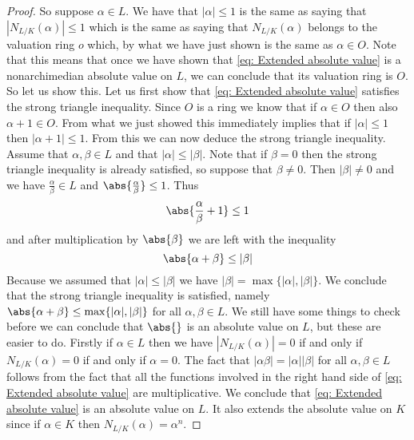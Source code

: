 \documentclass{article}
\begin{document}
\begin{proof}
    So suppose $\alpha \in L$. We have that $|\alpha| \leq 1$ is the same as saying that $|N_{L/K}(\alpha)| \leq 1$ which is the same as saying that $N_{L/K}(\alpha)$ belongs to the valuation ring $o$ which, by what we have just shown is the same as $\alpha \in O$. Note that this means that once we have shown that \cref{eq: Extended absolute value} is a nonarchimedian absolute value on $L$, we can conclude that its valuation ring is $O$. So let us show this. Let us first show that \cref{eq: Extended absolute value} satisfies the strong triangle inequality. Since $O$ is a ring we know that if $\alpha \in O$ then also $\alpha + 1 \in O$. From what we just showed this immediately implies that if $|\alpha|\leq 1$ then $|\alpha + 1| \leq 1$. From this we can now deduce the strong triangle inequality. Assume that $\alpha, \beta \in L$ and that $|\alpha| \leq |\beta|$. Note that if $\beta = 0$ then the strong triangle inequality is already satisfied, so suppose that $\beta \neq 0$. Then $|\beta| \neq 0$ and we have $\frac{\alpha}{\beta} \in L$ and $\abs{\frac{\alpha}{\beta}} \leq 1$. Thus 
    $$\abs{\frac{\alpha}{\beta} + 1} \leq 1$$ 
    and after multiplication by $\abs {\beta}$ we are left with the inequality
    $$\abs{\alpha + \beta} \leq |\beta|$$
    Because we assumed that $|\alpha| \leq |\beta|$ we have $|\beta| = \max \{|\alpha|,|\beta| \}$. We conclude that the strong triangle inequality is satisfied, namely
    $\abs{\alpha + \beta} \leq \max\{|\alpha|, |\beta|\}$ for all $\alpha, \beta \in L$. We still have some things to check before we can conclude that $\abs{}$ is an absolute value on $L$, but these are easier to do. Firstly if $\alpha \in L$ then we have $|N_{L/K}(\alpha)| = 0$ if and only if $N_{L/K}(\alpha) = 0$ if and only if $\alpha = 0$. The fact that $|\alpha \beta| = |\alpha| |\beta|$ for all $\alpha,\beta \in L$ follows from the fact that all the functions involved in the right hand side of \cref{eq: Extended absolute value} are multiplicative. We conclude that \cref{eq: Extended absolute value} is an absolute value on $L$. It also extends the absolute value on $K$ since if $\alpha \in K$ then $N_{L/K}(\alpha)= \alpha^n$.


\end{proof}
\end{document}
